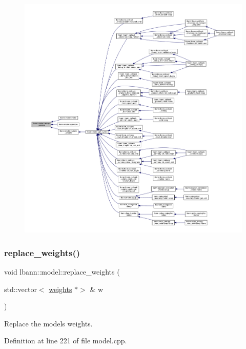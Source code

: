 \begin{figure}[H]
\begin{center}
\leavevmode
\includegraphics[width=350pt]{classlbann_1_1model_ac6cc0f5d850cfb997bbbc70eefa0d68f_icgraph}
\end{center}
\end{figure}
\mbox{\label{classlbann_1_1model_aaed20219476dc1458bbd058be36de1ec}} 
\subsubsection{\texorpdfstring{replace\+\_\+weights()}{replace\_weights()}}
{\footnotesize\ttfamily void lbann\+::model\+::replace\+\_\+weights (\begin{DoxyParamCaption}\item[{std\+::vector$<$ \hyperlink{classlbann_1_1weights}{weights} $\ast$$>$ \&}]{w }\end{DoxyParamCaption})}

Replace the model\textquotesingle{}s weights. 

Definition at line 221 of file model.\+cpp.


